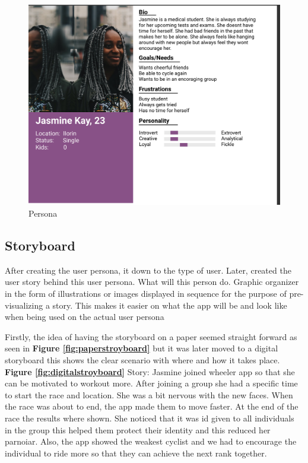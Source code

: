 \documentclass{l4proj}
\begin{document}
\begin{figure}
    \centering
     \includegraphics[width=1\textwidth]{images/Persona.png}
     \caption{Persona}
    \label{fig:persona}
\end{figure}
\vspace{3 cm }
\subsection{Storyboard}
After creating the user persona, it down to the type of user. Later,  created the user story behind this user persona. What will this person do. Graphic organizer in the form of illustrations or images displayed in sequence for the purpose of pre-visualizing a story. This makes it easier on what the app will be and look like when being used on the actual user persona 

Firstly, the idea of having the storyboard on a paper seemed straight forward  as seen in \textbf{Figure \ref{fig:paperstroyboard}}
 but it was later moved to a digital storyboard this shows the clear scenario with where and how it takes place.  \textbf{Figure \ref{fig:digitalstroyboard}}
Story:
Jasmine joined wheeler app so that she can be motivated to workout more. After joining a group she had a specific time to start the race and location. She was a bit nervous with the new faces. When the race was about to end, the app made them to move faster. At the end of the race the results where shown. She noticed that it was id given to all individuals in the group this helped them protect their identity and this reduced her parnoiar. Also, the app showed the weakest cyclist and we had to encourage the individual to ride more so that they can achieve the next rank together.
\end{document}
